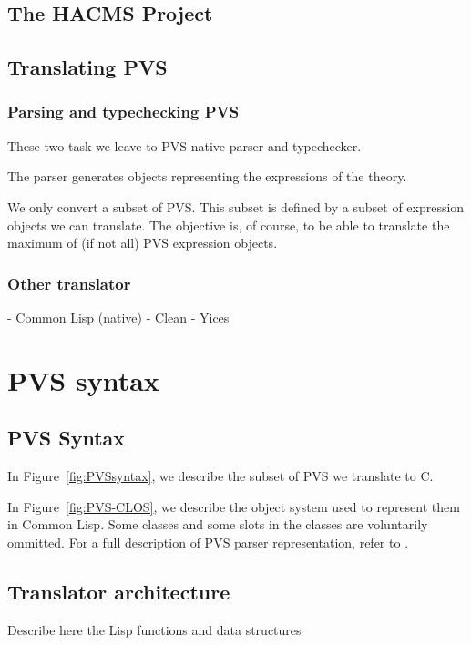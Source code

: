 \documentclass[12pt,a4paper]{article}
\begin{document}
\subsection{The HACMS Project}


\subsection{Translating PVS}
\subsubsection{Parsing and typechecking PVS}
These two task we leave to PVS native parser and typechecker.

The parser generates objects representing the expressions of the theory.

We only convert a subset of PVS.
This subset is defined by a subset of expression objects we can translate.
The objective is, of course, to be able to translate the maximum of (if not all) PVS expression objects.

\subsubsection{Other translator}
- Common Lisp (native)
- Clean
- Yices




\section{PVS syntax}

\subsection{PVS Syntax}

In Figure~\ref{fig:PVSsyntax}, we describe the subset of PVS we translate to C.

In Figure~\ref{fig:PVS-CLOS}, we describe the object system used to represent them in Common Lisp. Some classes and some slots in the classes are voluntarily ommitted. For a full description of PVS parser representation, refer to \cite{PVS:api}.




\subsection{Translator architecture}

Describe here the Lisp functions and data structures
\end{document}
